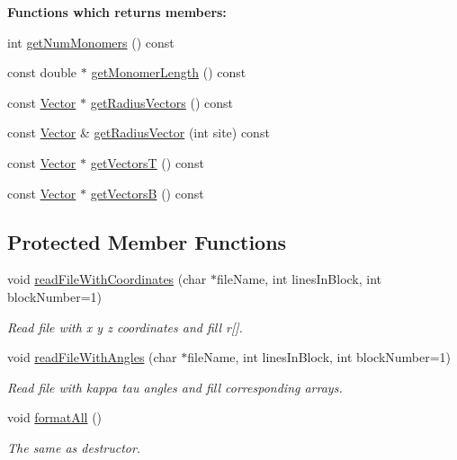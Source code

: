 \begin{Indent}{\bf Functions which returns members\+:}\par
\begin{DoxyCompactItemize}
\item 
int \hyperlink{class_p_c_a_1_1_polymer_a5c87b083f77c06ffd14278f87dad47ea}{get\+Num\+Monomers} () const
\item 
const double $\ast$ \hyperlink{class_p_c_a_1_1_polymer_af05e598bcd1e9987aca46d0661ac6dca}{get\+Monomer\+Length} () const
\item 
const \hyperlink{class_p_c_a_1_1_vector}{Vector} $\ast$ \hyperlink{class_p_c_a_1_1_polymer_a6e913f9b50a164c828f9a3cb89e452e1}{get\+Radius\+Vectors} () const
\item 
const \hyperlink{class_p_c_a_1_1_vector}{Vector} \& \hyperlink{class_p_c_a_1_1_polymer_ab2ea86763e0f0be646ef6aa6a105f927}{get\+Radius\+Vector} (int site) const
\item 
const \hyperlink{class_p_c_a_1_1_vector}{Vector} $\ast$ \hyperlink{class_p_c_a_1_1_polymer_a83c92fb07eafc88d121ef4b4124319c3}{get\+VectorsT} () const
\item 
const \hyperlink{class_p_c_a_1_1_vector}{Vector} $\ast$ \hyperlink{class_p_c_a_1_1_polymer_a4a90f901ceb688b0d96b126cc2ba3678}{get\+VectorsB} () const
\end{DoxyCompactItemize}
\end{Indent}
\subsection*{Protected Member Functions}
\begin{DoxyCompactItemize}
\item 
void \hyperlink{class_p_c_a_1_1_polymer_a777691bb321ef1da30a064757eb480c7}{read\+File\+With\+Coordinates} (char $\ast$file\+Name, int lines\+In\+Block, int block\+Number=1)
\begin{DoxyCompactList}\small\item\em Read file with x y z coordinates and fill r\mbox{[}\mbox{]}. \end{DoxyCompactList}\item 
void \hyperlink{class_p_c_a_1_1_polymer_a3e498b6e57d98c9cc4d07a7aedb4b6a5}{read\+File\+With\+Angles} (char $\ast$file\+Name, int lines\+In\+Block, int block\+Number=1)
\begin{DoxyCompactList}\small\item\em Read file with kappa tau angles and fill corresponding arrays. \end{DoxyCompactList}\item 
void \hyperlink{class_p_c_a_1_1_polymer_a3fcca4084a54ac8bc1941b36462bc560}{format\+All} ()
\begin{DoxyCompactList}\small\item\em The same as destructor. \end{DoxyCompactList}\end{DoxyCompactItemize}
